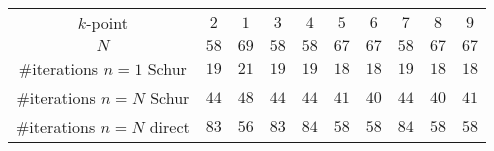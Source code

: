 \begin{tabular}{cccccccccc}
$k$-point & $2$ & $1$ & $3$ & $4$ & $5$ & $6$ & $7$ & $8$ & $9$\\
$N$ & $58$ & $69$ & $58$ & $58$ & $67$ & $67$ & $58$ & $67$ & $67$\\
\#iterations $n=1$ Schur & $19$ & $21$ & $19$ & $19$ & $18$ & $18$ & $19$ & $18$ & $18$\\
\#iterations $n=N$ Schur & $44$ & $48$ & $44$ & $44$ & $41$ & $40$ & $44$ & $40$ & $41$\\
\#iterations $n=N$ direct & $83$ & $56$ & $83$ & $84$ & $58$ & $58$ & $84$ & $58$ & $58$\\
\end{tabular}
